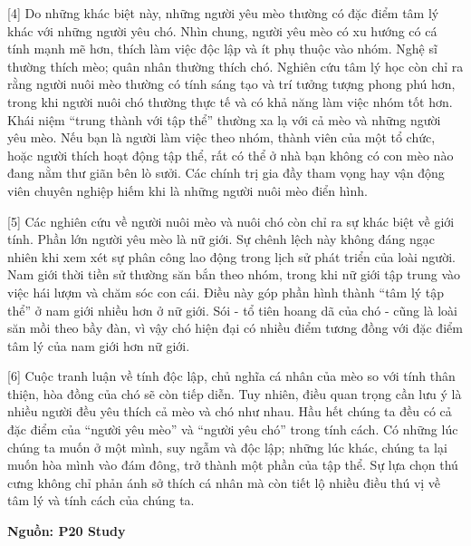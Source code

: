 \documentclass[12pt,a4paper,twoside]{article}
\newenvironment{readingpassage}[1][]{%
    \begin{tcolorbox}[enhanced, colback=grayLight, colframe=secondaryBlue,
        coltitle=textDark, fonttitle=\bfseries, title={#1},
        rounded corners, arc=3mm, boxrule=1pt,
        left=15pt, right=15pt, top=10pt, bottom=10pt,
        breakable, before skip=10pt, after skip=10pt, drop fuzzy shadow]
    \setstretch{1.3}
}{\end{tcolorbox}}
\begin{document}
\begin{readingpassage}[]
[4] Do những khác biệt này, những người yêu mèo thường có đặc điểm tâm lý khác với những người yêu chó. Nhìn chung, người yêu mèo có xu hướng có cá tính mạnh mẽ hơn, thích làm việc độc lập và ít phụ thuộc vào nhóm. Nghệ sĩ thường thích mèo; quân nhân thường thích chó. Nghiên cứu tâm lý học còn chỉ ra rằng người nuôi mèo thường có tính sáng tạo và trí tưởng tượng phong phú hơn, trong khi người nuôi chó thường thực tế và có khả năng làm việc nhóm tốt hơn. Khái niệm ``trung thành với tập thể'' thường xa lạ với cả mèo và những người yêu mèo. Nếu bạn là người làm việc theo nhóm, thành viên của một tổ chức, hoặc người thích hoạt động tập thể, rất có thể ở nhà bạn không có con mèo nào đang nằm thư giãn bên lò sưởi. Các chính trị gia đầy tham vọng hay vận động viên chuyên nghiệp hiếm khi là những người nuôi mèo điển hình.

[5] Các nghiên cứu về người nuôi mèo và nuôi chó còn chỉ ra sự khác biệt về giới tính. Phần lớn người yêu mèo là nữ giới. Sự chênh lệch này không đáng ngạc nhiên khi xem xét sự phân công lao động trong lịch sử phát triển của loài người. Nam giới thời tiền sử thường săn bắn theo nhóm, trong khi nữ giới tập trung vào việc hái lượm và chăm sóc con cái. Điều này góp phần hình thành ``tâm lý tập thể'' ở nam giới nhiều hơn ở nữ giới. Sói - tổ tiên hoang dã của chó - cũng là loài săn mồi theo bầy đàn, vì vậy chó hiện đại có nhiều điểm tương đồng với đặc điểm tâm lý của nam giới hơn nữ giới.

[6] Cuộc tranh luận về tính độc lập, chủ nghĩa cá nhân của mèo so với tính thân thiện, hòa đồng của chó sẽ còn tiếp diễn. Tuy nhiên, điều quan trọng cần lưu ý là nhiều người đều yêu thích cả mèo và chó như nhau. Hầu hết chúng ta đều có cả đặc điểm của ``người yêu mèo'' và ``người yêu chó'' trong tính cách. Có những lúc chúng ta muốn ở một mình, suy ngẫm và độc lập; những lúc khác, chúng ta lại muốn hòa mình vào đám đông, trở thành một phần của tập thể. Sự lựa chọn thú cưng không chỉ phản ánh sở thích cá nhân mà còn tiết lộ nhiều điều thú vị về tâm lý và tính cách của chúng ta.

\hfill \textbf{Nguồn: P20 Study}
\end{readingpassage}
\end{document}

